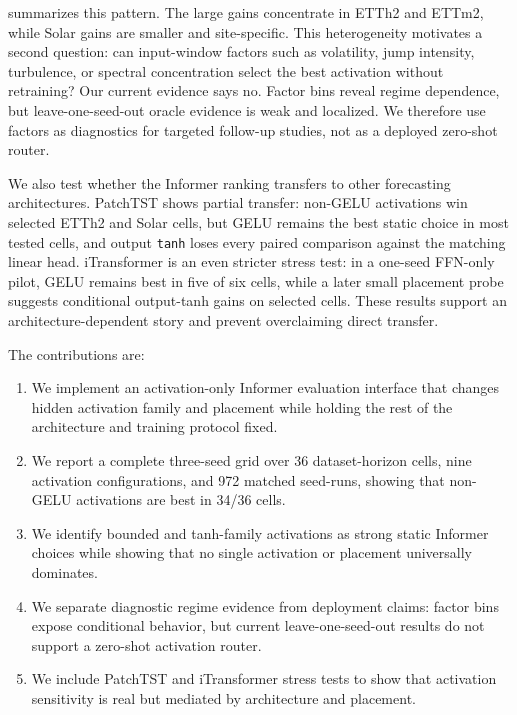 summarizes this pattern. The large gains concentrate in ETTh2 and ETTm2, while Solar gains are smaller and site-specific. This heterogeneity motivates a second question: can input-window factors such as volatility, jump intensity, turbulence, or spectral concentration select the best activation without retraining? Our current evidence says no. Factor bins reveal regime dependence, but leave-one-seed-out oracle evidence is weak and localized. We therefore use factors as diagnostics for targeted follow-up studies, not as a deployed zero-shot router.

We also test whether the Informer ranking transfers to other forecasting architectures. PatchTST \citep{nie2023patchtst} shows partial transfer: non-GELU activations win selected ETTh2 and Solar cells, but GELU remains the best static choice in most tested cells, and output \texttt{tanh} loses every paired comparison against the matching linear head. iTransformer \citep{liu2023itransformer} is an even stricter stress test: in a one-seed FFN-only pilot, GELU remains best in five of six cells, while a later small placement probe suggests conditional output-tanh gains on selected cells. These results support an architecture-dependent story and prevent overclaiming direct transfer.

The contributions are:
\begin{enumerate}
    \item We implement an activation-only Informer evaluation interface that changes hidden activation family and placement while holding the rest of the architecture and training protocol fixed.
    \item We report a complete three-seed grid over 36 dataset-horizon cells, nine activation configurations, and 972 matched seed-runs, showing that non-GELU activations are best in 34/36 cells.
    \item We identify bounded and tanh-family activations as strong static Informer choices while showing that no single activation or placement universally dominates.
    \item We separate diagnostic regime evidence from deployment claims: factor bins expose conditional behavior, but current leave-one-seed-out results do not support a zero-shot activation router.
    \item We include PatchTST and iTransformer stress tests to show that activation sensitivity is real but mediated by architecture and placement.
\end{enumerate}


